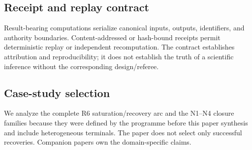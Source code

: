 \subsection{Receipt and replay contract}
Result-bearing computations serialize canonical inputs, outputs, identifiers, and authority boundaries. Content-addressed or hash-bound receipts permit deterministic replay or independent recomputation. The contract establishes attribution and reproducibility; it does not establish the truth of a scientific inference without the corresponding design/referee.

\subsection{Case-study selection}
We analyze the complete R6 saturation/recovery arc and the N1--N4 closure families because they were defined by the programme before this paper synthesis and include heterogeneous terminals. The paper does not select only successful recoveries. Companion papers own the domain-specific claims.